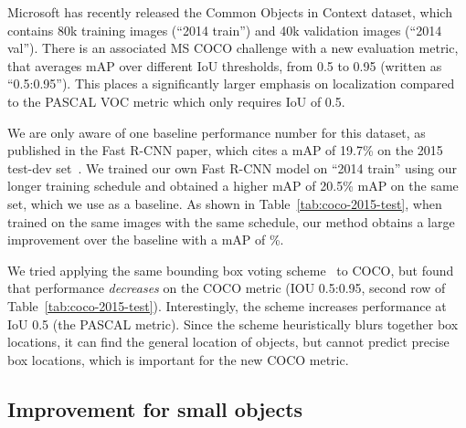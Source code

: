 \documentclass[10pt,twocolumn,letterpaper]{article}
\begin{document}
Microsoft has recently released the Common Objects in Context dataset, which
contains 80k training images (``2014 train'') and 40k validation images (``2014
val'').  There is an associated MS COCO challenge with a new evaluation metric,
that averages mAP over different IoU thresholds, from 0.5 to 0.95 (written as
``0.5:0.95'').  This places a significantly larger emphasis on localization
compared to the PASCAL VOC metric which only requires IoU of 0.5.

We are only aware of one baseline performance number for this dataset, as
published in the Fast R-CNN paper, which cites a mAP of 19.7\% on the
2015 test-dev set~\cite{fast-rcnn}.  We trained our own Fast R-CNN model on
``2014 train'' using our longer training schedule and obtained a higher mAP of
20.5\% mAP on the same set, which we use as a baseline.
As shown in Table~\ref{tab:coco-2015-test}, when trained on the same images with
the same schedule, our method obtains a large improvement over the baseline with
a mAP of \BestCOCOTest{}\%.

We tried applying the same bounding box voting scheme~\cite{MR-CNN} to COCO, but
found that performance \textit{decreases} on the COCO metric (IOU 0.5:0.95,
second row of Table~\ref{tab:coco-2015-test}).  Interestingly, the scheme increases
performance at IoU 0.5 (the PASCAL metric).  Since the scheme heuristically
blurs together box locations, it can find the general location of objects, but
cannot predict precise box locations, which is important for the new COCO metric.
\subsection{Improvement for small objects}
\end{document}
